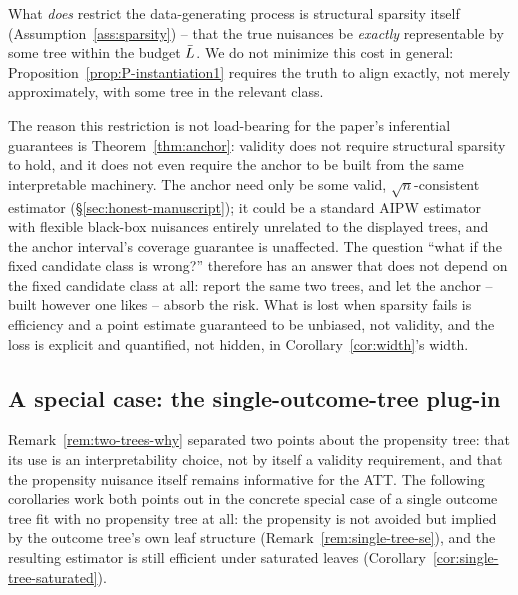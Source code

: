 \documentclass[12pt]{article}
\begin{document}
What \emph{does} restrict the data-generating process is structural sparsity
itself (Assumption~\ref{ass:sparsity}) -- that the true nuisances be
\emph{exactly} representable by some tree within the budget $\bar{L}$. We do
not minimize this cost in general: Proposition~\ref{prop:P-instantiation1} requires the truth
to align exactly, not merely approximately, with some tree in the relevant
class.

The reason this restriction is not load-bearing for the paper's inferential
guarantees is Theorem~\ref{thm:anchor}: validity does not require structural
sparsity to hold, and it does not even require the anchor to be built from the
same interpretable machinery. The anchor need only be some valid, $\sqrt
n$-consistent estimator (\S\ref{sec:honest-manuscript}); it could be a standard AIPW estimator with
flexible black-box nuisances entirely unrelated to the displayed trees, and
the anchor interval's coverage guarantee is unaffected. The question ``what
if the fixed candidate class is wrong?'' therefore has an answer that does
not depend on the fixed candidate class at all: report the same two trees,
and let the anchor -- built however one likes -- absorb the risk. What is
lost when sparsity fails is efficiency and a point estimate guaranteed to be
unbiased, not validity, and the loss is explicit and quantified, not hidden,
in Corollary~\ref{cor:width}'s width.

\subsection{A special case: the single-outcome-tree plug-in}
\label{sec:single-tree}

Remark~\ref{rem:two-trees-why} separated two points about the propensity tree: that its use is an interpretability choice, not by itself a validity requirement, and that the propensity nuisance itself remains informative for the ATT. The following corollaries work both points out in the concrete special case of a single outcome tree fit with no propensity tree at all: the propensity is not avoided but implied by the outcome tree's own leaf structure (Remark~\ref{rem:single-tree-se}), and the resulting estimator is still efficient under saturated leaves (Corollary~\ref{cor:single-tree-saturated}).
\end{document}
